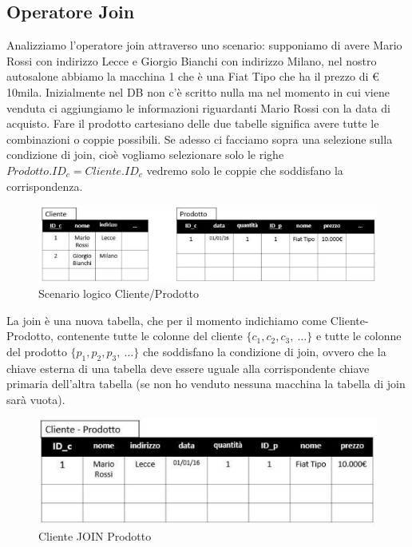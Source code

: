 \subsection{Operatore Join}

Analizziamo l'operatore join attraverso uno scenario: supponiamo di avere Mario Rossi  con indirizzo Lecce e Giorgio Bianchi con indirizzo Milano, nel nostro autosalone abbiamo  la macchina 1 che è una Fiat Tipo che ha il prezzo di € 10mila. Inizialmente nel DB non c'è scritto nulla ma nel momento in cui viene venduta ci aggiungiamo le informazioni riguardanti Mario Rossi con la data di acquisto. Fare il prodotto cartesiano delle due tabelle significa avere tutte  le combinazioni o coppie possibili. Se adesso ci facciamo sopra una selezione sulla condizione di join, cioè vogliamo selezionare solo le righe $Prodotto.ID_c = Cliente.ID_c$ vedremo solo le coppie che soddisfano la corrispondenza.   

\begin{center}
\begin{figure}[H]
\centering
\includegraphics[scale=0.8]{figures/cliente_prodotto_logical.png}
\caption{Scenario logico Cliente/Prodotto} 
\end{figure}
\end{center}

La join è una nuova tabella, che per il momento indichiamo come Cliente-Prodotto, contenente tutte le colonne del cliente $\{c_1, c_2, c_3,\ \dots\}$ e tutte le colonne del prodotto $\{p_1, p_2, p_3,\ \dots\}$ che soddisfano  la condizione di join, ovvero che la chiave esterna di una tabella deve essere uguale alla corrispondente chiave primaria dell'altra tabella (se non ho venduto nessuna macchina la tabella di join sarà vuota).  

\begin{center}
\begin{figure}[H]
\centering
\includegraphics[scale=0.8]{figures/cliente_join_prodotto.png}
\caption{Cliente JOIN Prodotto} 
\end{figure}
\end{center}

